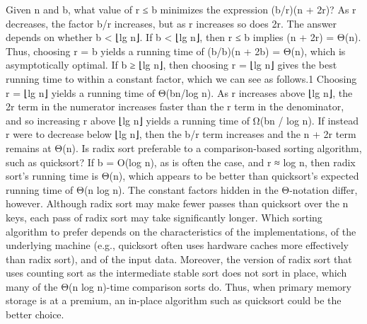 Given n and b, what value of r ≤ b minimizes the expression (b/r)(n + 2r)? As r decreases, the factor b/r increases, but as r increases so does 2r. The answer depends on whether b < ⌊lg n⌋. If b < ⌊lg n⌋, then r ≤ b implies (n + 2r) = Θ(n). Thus, choosing r = b yields a running time of (b/b)(n + 2b) = Θ(n), which is asymptotically optimal. If b ≥ ⌊lg n⌋, then choosing r = ⌊lg n⌋ gives the best running time to within a constant factor, which we can see as follows.1 Choosing r = ⌊lg n⌋ yields a running time of Θ(bn/log n). As r increases above ⌊lg n⌋, the 2r term in the numerator increases faster than the r term in the denominator, and so increasing r above ⌊lg n⌋ yields a running time of Ω(bn / log n). If instead r were to decrease below ⌊lg n⌋, then the b/r term increases and the n + 2r term remains at Θ(n).
Is radix sort preferable to a comparison-based sorting algorithm, such as quicksort? If b = O(log n), as is often the case, and r ≈ log n, then radix sort's running time is Θ(n), which appears to be better than quicksort's expected running time of Θ(n log n). The constant factors hidden in the Θ-notation differ, however. Although radix sort may make fewer passes than quicksort over the n keys, each pass of radix sort may take significantly longer. Which sorting algorithm to prefer depends on the characteristics of the implementations, of the underlying machine (e.g., quicksort often uses hardware caches more effectively than radix sort), and of the input data. Moreover, the version of radix sort that uses counting sort as the intermediate stable sort does not sort in place, which many of the Θ(n log n)-time comparison sorts do. Thus, when primary memory storage is at a premium, an in-place algorithm such as quicksort could be the better choice.


